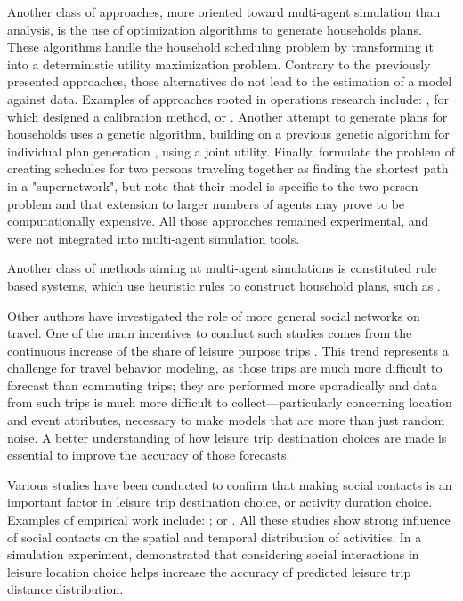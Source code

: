 {Another class of approaches, more oriented toward multi-agent simulation than analysis, is the use of optimization algorithms to generate households plans. These algorithms handle the household scheduling problem by transforming it into a deterministic utility maximization problem. Contrary to the previously presented approaches, those alternatives do not lead to the estimation of a model against data. Examples of approaches rooted in operations research include: \citet{Recker_TRR_1995}, for which \citet{ChowRecker_TranResB_2012} designed a calibration method, or \citet{GanRecker_TransResB_2008}. Another attempt to generate plans for households uses a genetic algorithm, building on a previous genetic algorithm for individual plan generation \citep{CharyparNagel2005ga4acts, MeisterEtAl_Transportation_2005}, using a joint utility. Finally, \citet{LiaoFEtAl_Transportation_2013} formulate the problem of creating schedules for two persons traveling together as finding the shortest path in a "supernetwork", but note that their model is specific to the two person problem and that extension to larger numbers of agents may prove to be computationally expensive. All those approaches remained experimental, and were not integrated into multi-agent simulation tools.

Another class of methods aiming at multi-agent simulations is constituted rule based systems, which use heuristic rules to construct household plans, such as \citet{MillerEtAl_Transportation_2005, ArentzeTimmermans_TransResB_2009}.

Other authors have investigated the role of more general social networks on travel. One of the main incentives to conduct such studies comes from the continuous increase of the share of leisure purpose trips  \citep{SchlichEtAl_TransportRev_2004,Axhausen_DonaghyEtAl_2005}. This trend represents a challenge for travel behavior modeling, as those trips are much more difficult to forecast than commuting trips; they are performed more sporadically and data from such trips is much more difficult to collect---particularly concerning location and event attributes, necessary to make models that are more than just random noise. A better understanding of how leisure trip destination choices are made is essential to improve the accuracy of those forecasts.

Various studies have been conducted to confirm that making social contacts is an important factor in leisure trip destination choice, or activity duration choice. Examples of empirical work include: \citet{CarrascoJAHabib_IATBR_2009}; \citet{HabibCarrascoJA_TRR_2011} or \citet{MooreJEtAl_Transportation_2013}. All these studies show strong influence of social contacts on the spatial and temporal distribution of activities. In a simulation experiment, \citet{Frei_PhDThesis_2012} demonstrated that considering social interactions in leisure location choice helps increase the accuracy of predicted leisure trip distance distribution.

}
